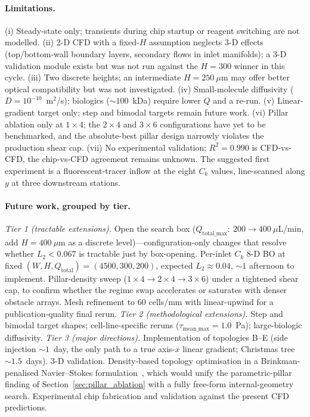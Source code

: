 \documentclass[12pt]{article}
\begin{document}
\paragraph{Limitations.} (i) Steady-state only; transients during chip startup or reagent switching are not modelled. (ii) 2-D CFD with a fixed-$H$ assumption neglects 3-D effects (top/bottom-wall boundary layers, secondary flows in inlet manifolds); a 3-D validation module exists but was not run against the $H = 300$ winner in this cycle. (iii) Two discrete heights; an intermediate $H = 250~\mu$m may offer better optical compatibility but was not investigated. (iv) Small-molecule diffusivity ($D = 10^{-10}$~m$^2$/s); biologics ($\sim 100$~kDa) require lower $Q$ and a re-run. (v) Linear-gradient target only; step and bimodal targets remain future work. (vi) Pillar ablation only at $1\!\times\!4$; the $2\!\times\!4$ and $3\!\times\!6$ configurations have yet to be benchmarked, and the absolute-best pillar design narrowly violates the production shear cap. (vii) No experimental validation; $R^2 = 0.990$ is CFD-vs-CFD, the chip-vs-CFD agreement remains unknown. The suggested first experiment is a fluorescent-tracer inflow at the eight $C_k$ values, line-scanned along $y$ at three downstream stations.

\paragraph{Future work, grouped by tier.}
\textit{Tier 1 (tractable extensions).} Open the search box ($Q_{\text{total\_max}}{:}~ 200 \to 400~\mu$L/min, add $H = 400~\mu$m as a discrete level)---configuration-only changes that resolve whether $L_2 < 0.067$ is tractable just by box-opening. Per-inlet $C_k$ 8-D BO at fixed $(W, H, Q_{\text{total}}) = (4500, 300, 200)$, expected $L_2 \approx 0.04$, $\sim 1$ afternoon to implement. Pillar-density sweep ($1\!\times\!4 \to 2\!\times\!4 \to 3\!\times\!6$) under a tightened shear cap, to confirm whether the regime swap accelerates or saturates with denser obstacle arrays. Mesh refinement to $60$ cells/mm with linear-upwind for a publication-quality final rerun. \textit{Tier 2 (methodological extensions).} Step and bimodal target shapes; cell-line-specific reruns ($\tau_{\text{mean\_max}} = 1.0$~Pa); large-biologic diffusivity. \textit{Tier 3 (major directions).} Implementation of topologies B--E (side injection $\sim 1$~day, the only path to a true axis-$x$ linear gradient; Christmas tree $\sim 1.5$~days). 3-D validation. Density-based topology optimisation in a Brinkman-penalised Navier--Stokes formulation~\cite{borrvall2003}, which would unify the parametric-pillar finding of Section~\ref{sec:pillar_ablation} with a fully free-form internal-geometry search. Experimental chip fabrication and validation against the present CFD predictions.
\end{document}
